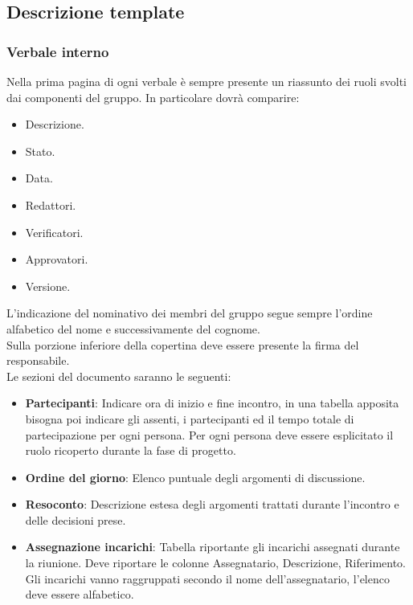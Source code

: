 \subsection{Descrizione template}
\subsubsection{Verbale interno}
Nella prima pagina di ogni verbale è sempre presente un riassunto dei ruoli svolti dai componenti del gruppo. 
In particolare dovrà comparire:
\begin{itemize}
    \item Descrizione.
    \item Stato.
    \item Data.
    \item Redattori.
    \item Verificatori.
    \item Approvatori.
    \item Versione.
\end{itemize}
L'indicazione del nominativo dei membri del gruppo segue sempre l'ordine alfabetico del nome e successivamente del cognome. \\
Sulla porzione inferiore della copertina deve essere presente la firma del responsabile. \\

\noindent
Le sezioni del documento saranno le seguenti:
\begin{itemize}
    \item \textbf{Partecipanti}: Indicare ora di inizio e fine incontro, in una tabella apposita bisogna poi indicare gli assenti, i partecipanti ed il tempo totale di partecipazione per ogni persona. Per ogni persona deve essere esplicitato il ruolo ricoperto durante la fase di progetto.
    \item \textbf{Ordine del giorno}: Elenco puntuale degli argomenti di discussione.
    \item \textbf{Resoconto}: Descrizione estesa degli argomenti trattati durante l'incontro e delle decisioni prese.
    \item \textbf{Assegnazione incarichi}: Tabella riportante gli incarichi assegnati durante la riunione. Deve riportare le colonne Assegnatario, Descrizione, Riferimento. Gli incarichi vanno raggruppati secondo il nome dell'assegnatario, l'elenco deve essere alfabetico.
\end{itemize}


